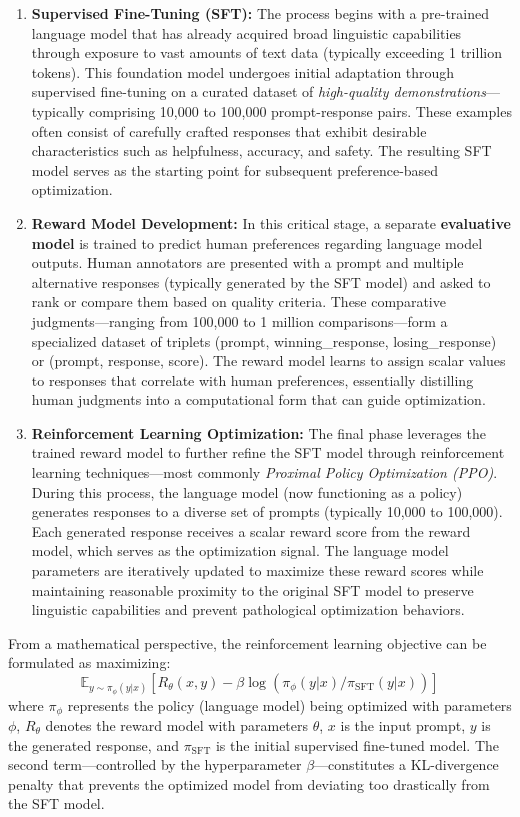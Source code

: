 \begin{enumerate}
    \item \textbf{Supervised Fine-Tuning (SFT):} The process begins with a pre-trained language model that has already acquired broad linguistic capabilities through exposure to vast amounts of text data (typically exceeding 1 trillion tokens). This foundation model undergoes initial adaptation through supervised fine-tuning on a curated dataset of \textit{high-quality demonstrations}—typically comprising 10,000 to 100,000 prompt-response pairs. These examples often consist of carefully crafted responses that exhibit desirable characteristics such as helpfulness, accuracy, and safety. The resulting SFT model serves as the starting point for subsequent preference-based optimization.
    
    \item \textbf{Reward Model Development:} In this critical stage, a separate \textbf{evaluative model} is trained to predict human preferences regarding language model outputs. Human annotators are presented with a prompt and multiple alternative responses (typically generated by the SFT model) and asked to rank or compare them based on quality criteria. These comparative judgments—ranging from 100,000 to 1 million comparisons—form a specialized dataset of triplets (prompt, winning\_response, losing\_response) or (prompt, response, score). The reward model learns to assign scalar values to responses that correlate with human preferences, essentially distilling human judgments into a computational form that can guide optimization.
    
    \item \textbf{Reinforcement Learning Optimization:} The final phase leverages the trained reward model to further refine the SFT model through reinforcement learning techniques—most commonly \textit{Proximal Policy Optimization (PPO)}. During this process, the language model (now functioning as a policy) generates responses to a diverse set of prompts (typically 10,000 to 100,000). Each generated response receives a scalar reward score from the reward model, which serves as the optimization signal. The language model parameters are iteratively updated to maximize these reward scores while maintaining reasonable proximity to the original SFT model to preserve linguistic capabilities and prevent pathological optimization behaviors.
\end{enumerate}

From a mathematical perspective, the reinforcement learning objective can be formulated as maximizing:
\[
\mathbb{E}_{y \sim \pi_\phi(y|x)}[R_\theta(x, y) - \beta \log(\pi_\phi(y|x)/\pi_{\text{SFT}}(y|x))]
\]
where \( \pi_\phi \) represents the policy (language model) being optimized with parameters \( \phi \), \( R_\theta \) denotes the reward model with parameters \( \theta \), \( x \) is the input prompt, \( y \) is the generated response, and \( \pi_{\text{SFT}} \) is the initial supervised fine-tuned model. The second term—controlled by the hyperparameter \( \beta \)—constitutes a KL-divergence penalty that prevents the optimized model from deviating too drastically from the SFT model.

